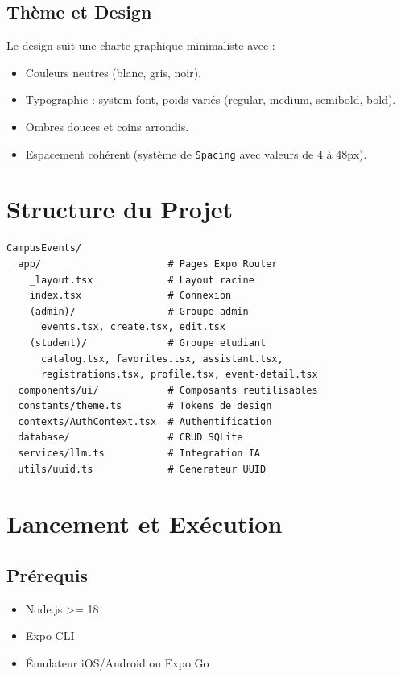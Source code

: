 \documentclass[12pt,a4paper]{article}
\begin{document}
\subsection{Thème et Design}

Le design suit une charte graphique minimaliste avec :

\begin{itemize}
    \item Couleurs neutres (blanc, gris, noir).
    \item Typographie : system font, poids variés (regular, medium, semibold, bold).
    \item Ombres douces et coins arrondis.
    \item Espacement cohérent (système de \texttt{Spacing} avec valeurs de 4 à 48px).
\end{itemize}

\section{Structure du Projet}

\begin{lstlisting}
CampusEvents/
  app/                      # Pages Expo Router
    _layout.tsx             # Layout racine
    index.tsx               # Connexion
    (admin)/                # Groupe admin
      events.tsx, create.tsx, edit.tsx
    (student)/              # Groupe etudiant
      catalog.tsx, favorites.tsx, assistant.tsx,
      registrations.tsx, profile.tsx, event-detail.tsx
  components/ui/            # Composants reutilisables
  constants/theme.ts        # Tokens de design
  contexts/AuthContext.tsx  # Authentification
  database/                 # CRUD SQLite
  services/llm.ts           # Integration IA
  utils/uuid.ts             # Generateur UUID
\end{lstlisting}

\section{Lancement et Exécution}

\subsection{Prérequis}

\begin{itemize}
    \item Node.js >= 18
    \item Expo CLI
    \item Émulateur iOS/Android ou Expo Go
\end{itemize}
\end{document}
